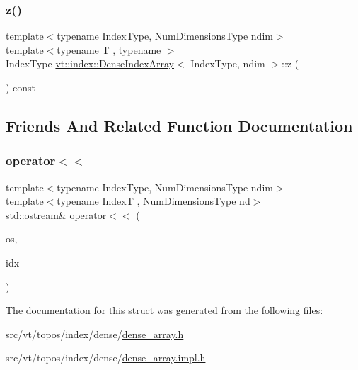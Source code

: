 \mbox{\label{structvt_1_1index_1_1_dense_index_array_a9bd7a86415c7ce861f5cf17dd5a849e0}} 
\subsubsection{\texorpdfstring{z()}{z()}\hspace{0.1cm}{\footnotesize\ttfamily [2/2]}}
{\footnotesize\ttfamily template$<$typename Index\+Type, Num\+Dimensions\+Type ndim$>$ \\
template$<$typename T , typename $>$ \\
Index\+Type \hyperlink{structvt_1_1index_1_1_dense_index_array}{vt\+::index\+::\+Dense\+Index\+Array}$<$ Index\+Type, ndim $>$\+::z (\begin{DoxyParamCaption}{ }\end{DoxyParamCaption}) const}



\subsection{Friends And Related Function Documentation}
\mbox{\label{structvt_1_1index_1_1_dense_index_array_ad8dd7b7925f5c66e3264bd14c3e4f2ce}} 
\subsubsection{\texorpdfstring{operator$<$$<$}{operator<<}}
{\footnotesize\ttfamily template$<$typename Index\+Type, Num\+Dimensions\+Type ndim$>$ \\
template$<$typename IndexT , Num\+Dimensions\+Type nd$>$ \\
std\+::ostream\& operator$<$$<$ (\begin{DoxyParamCaption}\item[{std\+::ostream \&}]{os,  }\item[{\hyperlink{structvt_1_1index_1_1_dense_index_array}{Dense\+Index\+Array}$<$ IndexT, nd $>$ const \&}]{idx }\end{DoxyParamCaption})\hspace{0.3cm}{\ttfamily [friend]}}



The documentation for this struct was generated from the following files\+:\begin{DoxyCompactItemize}
\item 
src/vt/topos/index/dense/\hyperlink{dense__array_8h}{dense\+\_\+array.\+h}\item 
src/vt/topos/index/dense/\hyperlink{dense__array_8impl_8h}{dense\+\_\+array.\+impl.\+h}\end{DoxyCompactItemize}

